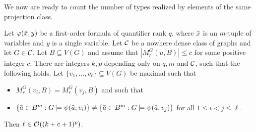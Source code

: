 We now are ready to count the number of types realized by elements
of the same projection class. 

\begin{lemma}\label{lem:num-types-same-class}
Let $\varphi(\bar{x},y)$ be a first-order formula of quantifier rank $q$, 
where $\bar{x}$ is an $m$-tuple of 
variables and $y$ is a single variable. Let $\mathcal{C}$ be a nowhere dense class of 
graphs and let $G\in\mathcal{C}$. Let 
$B\subseteq V(G)$ and assume that 
$|M_r^G(u,B)|\leq c$ for some positive integer
$c$. There are integers $k,p$ depending only on $q,m$ and $\mathcal{C}$, such that 
the following holds. Let $\{v_1,\ldots,v_\ell\}\subseteq V(G)$ be maximal such that
\begin{itemize}
\item $M_r^G(v_i,B)=M_r^G(v_j,B)$ and such that 
\item $\{\bar{a} \in B^m : G\models\psi(\bar{a},v_i)\}\neq \{\bar{a} \in B^m : G\models\psi(\bar{a},v_j)\}$
for all $1\leq i<j\leq \ell$. 
\end{itemize}
Then $\ell\in\mathcal{O}((k+c+1)^p)$. 
\end{lemma}
